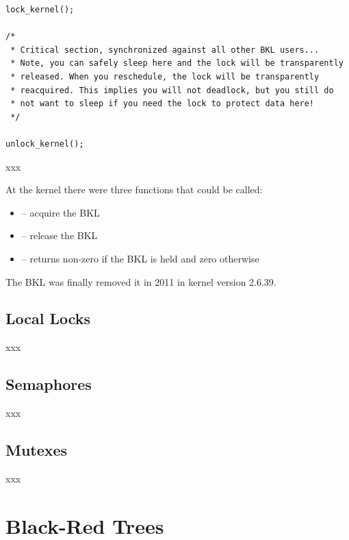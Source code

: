 \begin{lstlisting}
lock_kernel();

/*
 * Critical section, synchronized against all other BKL users...
 * Note, you can safely sleep here and the lock will be transparently
 * released. When you reschedule, the lock will be transparently
 * reacquired. This implies you will not deadlock, but you still do
 * not want to sleep if you need the lock to protect data here!
 */

unlock_kernel();
\end{lstlisting}

\noindent
xxx

At the kernel there were three functions that could be called:

\begin{itemize}
	\item {} -- acquire the BKL
	\item {} -- release the BKL
	\item {} -- returns non-zero if the BKL is held and zero otherwise
\end{itemize}

\noindent
The BKL was finally removed it in 2011 in kernel version 2.6.39. 


\subsection{Local Locks}

xxx

\subsection{Semaphores}

xxx

\subsection{Mutexes}

xxx


\section{Black-Red Trees}

